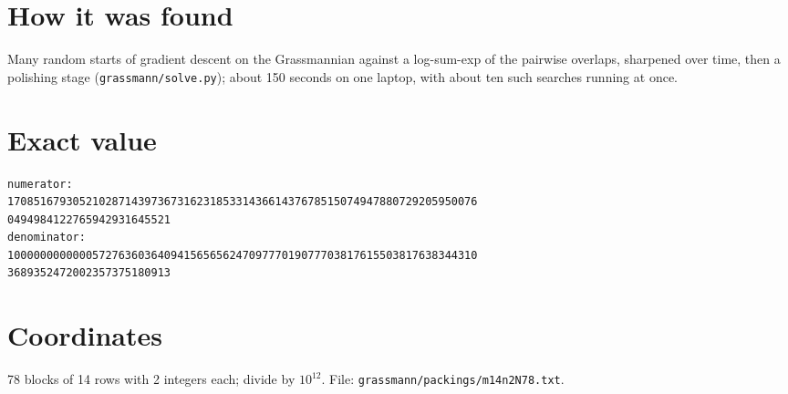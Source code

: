 \documentclass[11pt,a4paper]{article}
\begin{document}
\section{How it was found}
Many random starts of gradient descent on the Grassmannian against a log-sum-exp of the pairwise overlaps, sharpened over time, then a polishing stage (\texttt{grassmann/solve.py}); about 150 seconds on one laptop, with about ten such searches running at once.


\appendix
\section{Exact value}
{\small
\begin{verbatim}
numerator:
170851679305210287143973673162318533143661437678515074947880729205950076
0494984122765942931645521
denominator:
100000000000057276360364094156565624709777019077703817615503817638344310
3689352472002357375180913
\end{verbatim}}

\section{Coordinates}
78 blocks of 14 rows with 2 integers each; divide by $10^{12}$. File: \texttt{grassmann/packings/m14n2N78.txt}.
{\tiny
\begin{multicols}{4}
\end{multicols}}
\end{document}
